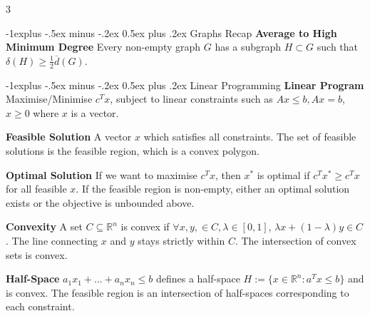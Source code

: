 \documentclass[10pt, landscape]{article}
\makeatletter
\renewcommand{\section}{\@startsection{section}{1}{0mm}%
                                {-1ex plus -.5ex minus -.2ex}%
                                {0.5ex plus .2ex}%
                                {\normalfont\large\bfseries}}
\renewcommand{\section}{\@startsection{section}{2}{0mm}%
                                {-1explus -.5ex minus -.2ex}%
                                {0.5ex plus .2ex}%
                                {\normalfont\normalsize\bfseries}}
\makeatother
\begin{document}
\raggedright
\footnotesize
\begin{multicols*}{3}

\setlength{\columnseprule}{0.25pt}
\setlength{\premulticols}{1pt}
\setlength{\postmulticols}{1pt}
\setlength{\multicolsep}{1pt}
\setlength{\columnsep}{2pt}

\begin{center}
\end{center}

\section{Graphs Recap}
\textbf{Average to High Minimum Degree} Every non-empty graph $G$ has a subgraph $H \subset G$ such that $\delta(H) \geq \frac{1}{2}\overline{d}(G)$.

\section{Linear Programming}
\textbf{Linear Program} Maximise/Minimise $c^Tx$, subject to linear constraints such as $Ax \leq b, Ax=b$, $x \geq 0$ where $x$ is a vector.

\textbf{Feasible Solution} A vector $x$ which satisfies all constraints. The set of feasible solutions is the feasible region, which is a convex polygon.

\textbf{Optimal Solution} If we want to maximise $c^Tx$, then $x^*$ is optimal if $c^Tx^* \geq c^Tx$ for all feasible $x$. If the feasible region is non-empty, either an optimal solution exists or the objective is unbounded above.

\textbf{Convexity} A set $C \subseteq \mathbb{R}^n$ is convex if $\forall x, y, \in C, \lambda \in [0,1]$, $\lambda x + (1-\lambda)y \in C$. The line connecting $x$ and $y$ stays strictly within $C$. The intersection of convex sets is convex.

\textbf{Half-Space} $a_1x_1+...+a_nx_n \leq b$ defines a half-space $H:=\{x \in \mathbb{R}^n: a^Tx \leq b\}$ and is convex. The feasible region is an intersection of half-spaces corresponding to each constraint.


\end{multicols*}
\end{document}
